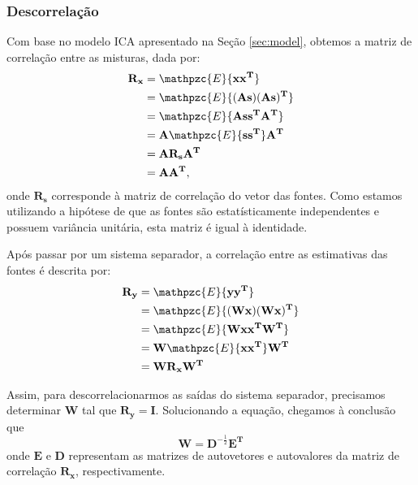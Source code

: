     \subsubsection{Descorrelação}
    Com base no modelo ICA apresentado na Seção \ref{sec:model}, obtemos a matriz de correlação entre as misturas, dada por:
    \begin{equation}
        \label{eq:correlationmatrixforx}
        \begin{split}
        \mathbf{R_x} & = \mathpzc{E}\{\mathbf{xx^T}\}\\
                     & = \mathpzc{E}\{\mathbf{(As)(As)^T}\}\\
                     & = \mathpzc{E}\{\mathbf{Ass^TA^T}\} \\
                     & = \mathbf{A}\mathpzc{E}\{\mathbf{ss^T}\}\mathbf{A^T} \\
                     & = \mathbf{A}\mathbf{R_s}\mathbf{A^T} \\
                     & = \mathbf{A}\mathbf{A^T}, \\
        \end{split}
    \end{equation}
    onde $\mathbf{R_s}$ corresponde à matriz de correlação do vetor das fontes. Como estamos utilizando a hipótese de que as fontes são estatísticamente independentes e possuem variância unitária, esta matriz é igual à identidade.
    
    Após passar por um sistema separador, a correlação entre as estimativas das fontes é descrita por:
    \begin{equation}
        \label{eq:correlationmatrixfory}
        \begin{split}
        \mathbf{R_y} & = \mathpzc{E}\{\mathbf{yy^T}\}\\
                     & = \mathpzc{E}\{\mathbf{(Wx)(Wx)^T}\}\\
                     & = \mathpzc{E}\{\mathbf{Wxx^TW^T}\} \\
                     & = \mathbf{W}\mathpzc{E}\{\mathbf{xx^T}\}\mathbf{W^T} \\
                     & = \mathbf{W}\mathbf{R_x}\mathbf{W^T}\\
        \end{split}
    \end{equation}
    
    Assim, para descorrelacionarmos as saídas do sistema separador, precisamos determinar $\mathbf{W}$ tal que $\mathbf{R_y = I}$. Solucionando a equação, chegamos à conclusão que
    \begin{equation}
        \label{eq:separationmatrixsolution}
        \mathbf{W} = \mathbf{D}^{-\frac{1}{2}}\mathbf{E^T}
    \end{equation}
    onde $\mathbf{E}$ e $\mathbf{D}$ representam as matrizes de autovetores e autovalores da matriz de correlação $\mathbf{R_x}$, respectivamente.
    
